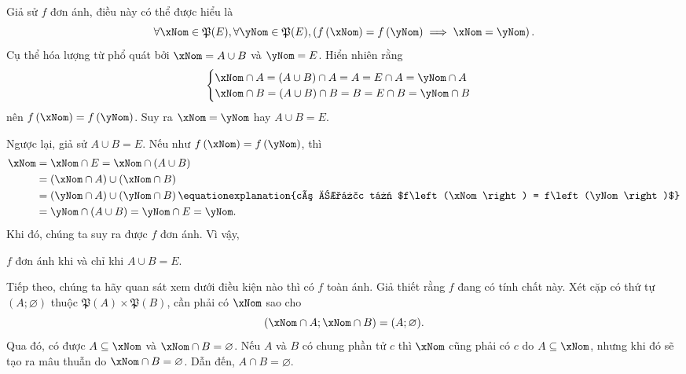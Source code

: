 \solution

Giả sử $f$ đơn ánh, điều này có thể được hiểu là \begin{equation*}
   \forall \xNom \in \mathfrak{P}(E), \forall \yNom \in \mathfrak{P}(E), \left(f\left(\xNom\right) = f\left(\yNom\right) \implies \xNom = \yNom\right).
\end{equation*}
Cụ thể hóa lượng từ phổ quát bởi $\xNom = A \cup B$ và $\yNom = E$. Hiển nhiên rằng \begin{equation*}
   \begin{cases}
      \xNom \cap A = (A \cup B) \cap A = A = E \cap A = \yNom \cap A \\
      \xNom \cap B = (A \cup B) \cap B = B = E \cap B = \yNom \cap B
   \end{cases}
\end{equation*}
nên $f\left(\xNom\right) = f\left(\yNom\right)$. Suy ra $\xNom = \yNom$ hay $A \cup B = E$.

Ngược lại, giả sử $A \cup B = E$. Nếu như $f\left(\xNom\right) = f\left(\yNom\right)$, thì 
\begin{align*}
   \xNom &= \xNom \cap E = \xNom \cap (A \cup B) \\
      &= \left(\xNom \cap A\right) \cup \left(\xNom \cap B\right) \\
      &= \left(\yNom \cap A\right) \cup \left(\yNom \cap B\right) \equationexplanation{có được từ $f\left(\xNom\right) = f\left(\yNom\right)$}\\
      &= \yNom \cap (A \cup B) = \yNom \cap E = \yNom.
\end{align*}
Khi đó, chúng ta suy ra được $f$ đơn ánh. Vì vậy,
\begin{center}
$f$ đơn ánh khi và chỉ khi $A \cup B = E$.
\end{center}

Tiếp theo, chúng ta hãy quan sát xem dưới điều kiện nào thì có $f$ toàn ánh. Giả thiết rằng $f$ đang có tính chất này. Xét cặp có thứ tự $(A; \varnothing)$ thuộc $\mathfrak{P}(A) \times \mathfrak{P}(B)$, cần phải có $\xNom$ sao cho \begin{equation*}
   (\xNom \cap A; \xNom \cap B) = (A; \varnothing).
\end{equation*}
Qua đó, có được $A \subseteq \xNom$ và $\xNom \cap B = \varnothing$. Nếu $A$ và $B$ có chung phần tử $c$ thì $\xNom$ cũng phải có $c$ do $A \subseteq \xNom$, nhưng khi đó sẽ tạo ra mâu thuẫn do $\xNom \cap B = \varnothing$. Dẫn đến, $A \cap B = \varnothing$.

